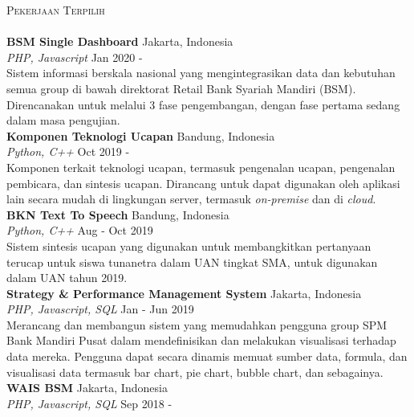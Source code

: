 \documentclass[a4paper]{article}
\newcommand{\lineunder} {
    \vspace*{-8pt} \\
    \hspace*{-18pt} \hrulefill \\
}
\newcommand{\header} [1] {
    {\hspace*{-18pt}\vspace*{6pt} \textsc{#1}}
    \vspace*{-6pt} \lineunder
}
\begin{document}
\header{Pekerjaan Terpilih}
\vspace{2mm}
{\textbf{BSM Single Dashboard}} \hfill Jakarta, Indonesia \\
{\sl PHP, Javascript} \hfill Jan 2020 - \\
\vspace{1mm}
Sistem informasi berskala nasional yang mengintegrasikan data dan kebutuhan
semua group di bawah direktorat Retail Bank Syariah Mandiri (BSM). Direncanakan
untuk melalui 3 fase pengembangan, dengan fase pertama sedang dalam masa
pengujian.\\
\vspace*{3mm}
{\textbf{Komponen Teknologi Ucapan}} \hfill Bandung, Indonesia \\
{\sl Python, C++} \hfill Oct 2019 - \\
\vspace{1mm}
Komponen terkait teknologi ucapan, termasuk pengenalan ucapan, pengenalan
pembicara, dan sintesis ucapan. Dirancang untuk dapat digunakan oleh aplikasi
lain secara mudah di lingkungan server, termasuk \textit{on-premise} dan di
\textit{cloud}. \\
\vspace*{3mm}
{\textbf{BKN Text To Speech}} \hfill Bandung, Indonesia \\
{\sl Python, C++} \hfill Aug - Oct 2019 \\
\vspace*{1mm}
Sistem sintesis ucapan yang digunakan untuk membangkitkan pertanyaan terucap
untuk siswa tunanetra dalam UAN tingkat SMA, untuk digunakan dalam UAN tahun
2019.\\
\vspace*{3mm}
{\textbf{Strategy & Performance Management System}} \hfill Jakarta, Indonesia \\
{\sl PHP, Javascript, SQL} \hfill Jan - Jun 2019 \\
\vspace*{1mm}
Merancang dan membangun sistem yang memudahkan pengguna group SPM Bank
Mandiri Pusat dalam mendefinisikan dan melakukan visualisasi terhadap data
mereka. Pengguna dapat secara dinamis memuat sumber data, formula, dan
visualisasi data termasuk bar chart, pie chart, bubble chart, dan sebagainya.\\
\vspace*{3mm}
{\textbf{WAIS BSM}} \hfill Jakarta, Indonesia \\
{\sl PHP, Javascript, SQL} \hfill Sep 2018 - \\
\vspace*{1mm}
\end{document}
